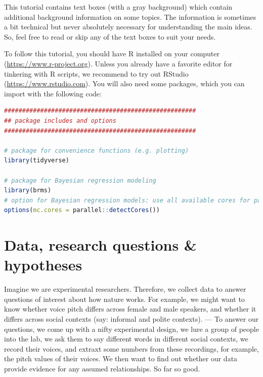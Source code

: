 \documentclass[nobib]{tufte-handout}
\begin{document}
This tutorial contains text boxes (with a gray background) which contain additional background information on some topics.
The information is sometimes a bit technical but never absolutely necessary for understanding the main ideas.
So, feel free to read or skip any of the text boxes to suit your needs.

To follow this tutorial, you should have R installed on your computer (\url{https://www.r-project.org}).
Unless you already have a favorite editor for tinkering with R scripts, we recommend to try out RStudio (\url{https://www.rstudio.com}).
You will also need some packages,
which you can import with the following code:

\begin{minipage}[]{\textwidth}
\begin{lstlisting}[language=R]
#####################################################
## package includes and options
#####################################################

# package for convenience functions (e.g. plotting)
library(tidyverse)

# package for Bayesian regression modeling
library(brms)
# option for Bayesian regression models: use all available cores for parallel computing
options(mc.cores = parallel::detectCores())
\end{lstlisting}
\end{minipage}

\section{Data, research questions \& hypotheses}
\label{sec:data}

Imagine we are experimental researchers. Therefore, we collect data to answer questions of
interest about how nature works. For example, we might want to know whether voice pitch differs across female and male speakers, and whether it differs across social contexts (say: informal and polite contexts). --- To answer our questions, we come up with a nifty experimental design, we lure a group of people into the lab, we ask them to say different words in different social contexts, we record their voices, and extraxt some numbers from these recordings, for example, the pitch values of their voices. We then want to find out whether our data provide evidence for any assumed relationships. So far so good.
\end{document}
